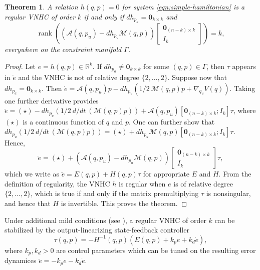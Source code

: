 \documentclass[journal,twoside,onecolumn,draftclsnofoot,web]{ieeecolor}
\newtheorem{thm}{Theorem}%
\DeclareMathOperator{\Rank}{rank}
\newcommand*{\rank}[1]{\Rank\left(#1\right)}
\newcommand*{\inv}{^\mathsf{-1}}
\newcommand*{\R}{\mathbb{R}}
\newcommand*{\Id}[1]{I_{#1}}
\newcommand*{\Zmat}[1]{\bm{0}_{#1}}
\newcommand*{\simpleB}{\begin{bmatrix}\Zmat{(n-k)\times k}\\ \Id{k}\end{bmatrix}}
\begin{document}
\begin{thm}\label{thm:vnhc-regularity}
    A relation \(h(q,p) = 0\) for system \eqref{eqn:simple-hamiltonian}
    is a regular VNHC of order \(k\) if and only if 
    \(dh_{p_a} = \Zmat{k \times k}\) 
    and
    \[
        \rank{\left(\mathcal{A}(q,p_u) - dh_{p_u}\mathcal{M}(q,p)\right)\simpleB} = k
         ,
    \]
    everywhere on the constraint manifold \(\Gamma\).
\end{thm}
\begin{proof}
    Let \(e = h(q,p) \in \R^k\).
    If \(dh_{p_a} \neq \Zmat{k\times k}\) for some \((q,p) \in \Gamma\), 
    then \(\tau\) appears in \(\dot{e}\) and the VNHC is not of relative degree
    \(\{2,\ldots,2\}\). Suppose now that \(dh_{p_a} = \Zmat{k\times k}\).
    Then 
    \(\dot{e} = \mathcal{A}(q,p_u)p - 
     dh_{p_u}\left(1/2~\mathcal{M}(q,p)p + \nabla_{q_u}V(q)\right)\).
    Taking one further derivative provides
    \( \ddot{e} = (\star) - 
        dh_{p_u}\left(1/2~d/dt~\left(\mathcal{M}(q,p)p\right)\right) 
        + \mathcal{A}(q,p_u)[\Zmat{(n-k)\times k};\Id{k}] \tau\),
    where \((\star)\) is a continuous function of \(q\) and \(p\).
    One can further show that
    \(dh_{p_u}\left(1/2~d/dt~\left(\mathcal{M}(q,p)p\right)\right)
        = (\star) + dh_{p_u}\mathcal{M}(q,p)[\Zmat{(n-k)\times k};
        \Id{k}]\tau\).
    Hence,
    \[
       \ddot{e} = (\star) +
       \left(\mathcal{A}(q,p_u) - dh_{p_u}\mathcal{M}(q,p)\right) \simpleB \tau
        ,
    \]
    which we write as \( \ddot{e} = E(q,p) + H(q,p)\tau\) for appropriate \(E\)
    and \(H\).
    From the definition of regularity, the VNHC \(h\) is regular 
    when \(e\) is of relative degree \(\{2,\ldots,2\}\), which is true 
    if and only if the matrix premultiplying \(\tau\) is nonsingular, and hence
    that \(H\) is invertible. This proves the theorem.
\end{proof}

Under additional mild conditions (see \cite{vhcs_for_el_systems}), a regular VNHC of
order \(k\) can be stabilized by the output-linearizing state-feedback
controller
\begin{equation}\label{eqn:stabilizing-controller}
    \tau(q,p) = -H\inv(q,p)\left(E(q,p) + k_p e + k_d \dot{e}\right)
    ,
\end{equation}
where \(k_p, k_d > 0\) are control parameters which can be tuned on the
resulting error dynamices \(\ddot{e} = -k_p e - k_d \dot{e}\).
\end{document}

